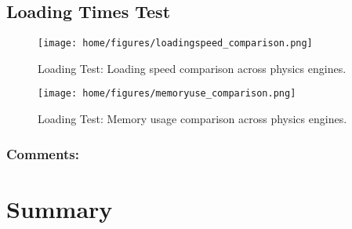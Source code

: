 \documentclass[11pt,a4paper]{article}
\begin{document}
\subsection{Loading Times Test}
\begin{figure}[H]
    \centering
    \texttt{[image: home/figures/loadingspeed\_comparison.png]}
    \caption{Loading Test: Loading speed comparison across physics engines.}
    \label{fig:loading_speed_comparison}
\end{figure}
\begin{figure}[H]
    \centering
    \texttt{[image: home/figures/memoryuse\_comparison.png]}
    \caption{Loading Test: Memory usage comparison across physics engines.}
    \label{fig:memory_usage_comparison}
\end{figure}

\subsubsection{Comments:}
\section{Summary}





\end{document}
